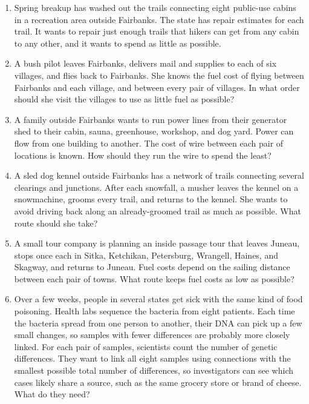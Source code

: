 \documentclass[12pt]{article}
\begin{document}
\begin{enumerate}
\item Spring breakup has washed out the trails connecting eight public-use cabins in a recreation area outside Fairbanks. The state has repair estimates for each trail. It wants to repair just enough trails that hikers can get from any cabin to any other, and it wants to spend as little as possible.


\vfill

\item A bush pilot leaves Fairbanks, delivers mail and supplies to each of six villages, and flies back to Fairbanks. She knows the fuel cost of flying between Fairbanks and each village, and between every pair of villages. In what order should she visit the villages to use as little fuel as possible?


\vfill

\item A family outside Fairbanks wants to run power lines from their generator shed to their cabin, sauna, greenhouse, workshop, and dog yard. Power can flow from one building to another. The cost of wire between each pair of locations is known. How should they run the wire to spend the least?

\vfill

\item A sled dog kennel outside Fairbanks has a network of trails connecting several clearings and junctions. After each snowfall, a musher leaves the kennel on a snowmachine, grooms every trail, and returns to the kennel. She wants to avoid driving back along an already-groomed trail as much as possible. What route should she take?

\vfill


\newpage

\item A small tour company is planning an inside passage tour that leaves Juneau, stops once each in Sitka, Ketchikan, Petersburg, Wrangell, Haines, and Skagway, and returns to Juneau. Fuel costs depend on the sailing distance between each pair of towns. What route keeps fuel costs as low as possible?



\vfill

\item Over a few weeks, people in several states get sick with the same kind of food poisoning. Health labs sequence the bacteria from eight patients. Each time the bacteria spread from one person to another, their DNA can pick up a few small changes, so samples with fewer differences are probably more closely linked. For each pair of samples, scientists count the number of genetic differences. They want to link all eight samples using connections with the smallest possible total number of differences, so investigators can see which cases likely share a source, such as the same grocery store or brand of cheese. What do they need?


\end{enumerate}
\end{document}
